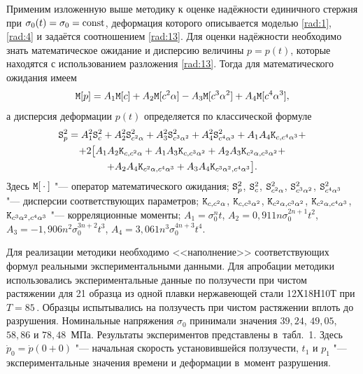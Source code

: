 Применим изложенную выше методику к оценке надёжности единичного стержня при $\sigma_0(t)=\sigma_0={\rm const}$, деформация которого описывается моделью \eqref{rad:1}, \eqref{rad:4} и задаётся соотношением \eqref{rad:13}. 
Для оценки надёжности необходимо знать математическое ожидание и дисперсию величины $p=p(t)$, которые находятся с использованием разложения \eqref{rad:13}. Тогда для математического ожидания имеем
$$
{\tt M}[p]=A_1 {\tt M}[c]+A_2 {\tt M}[c^2\alpha]- A_3 {\tt M}[c^3\alpha^2]+
A_4 {\tt M}[c^4\alpha^3],
$$
а дисперсия деформации $p(t)$ определяется по классической формуле
\begin{multline}
{\tt S}_p^2=A_1^2{\tt S}_c^2+A_2^2{\tt S}_{c^2\alpha}^2+A_3^2{\tt S}_{c^3\alpha^2}^2+A_4^2{\tt S}_{c^4\alpha^3}^2+ A_1A_4 {
\tt K}_{c,c^4\alpha^3}+ \\ 
+
2\bigl[A_1A_2{\tt K}_{c,c^2\alpha}+ A_1A_3{\tt K}_{c,c^3\alpha^2}+ A_2A_3 {\tt K}_{c^2\alpha,c^3\alpha^2}+ \\ 
+A_2A_4{\tt K}_{c^2\alpha,c^4\alpha^3}+A_3A_4{\tt K}_{c^3\alpha^2,c^4\alpha^3}\bigr].
\label{rad:18}
\end{multline}
Здесь   ${\tt M}[{}\cdot{}]$ "--- оператор математического ожидания;
${\tt S}_p^2$, ${\tt S}_c^2$, ${\tt S}_{c^2\alpha}^2$, ${\tt S}_{c^3\alpha^2}^2$, ${\tt S}_{c^4\alpha^3}^2$ "--- дисперсии соответствующих параметров;  
${\tt K}_{c,c^2\alpha}$, ${\tt K}_{c,c^3\alpha^2}$, ${\tt K}_{c^2\alpha,c^3\alpha^2}$, ${\tt K}_{c^2\alpha,c^4\alpha^3}$,\linebreak ${\tt K}_{c^3\alpha^2,c^4\alpha^3}$ "--- корреляционные моменты;
$A_1=\sigma_0^nt$, $A_2=0,911n\sigma_0^{2n+1}t^2$, $A_3={-1,906n^2\sigma_0^{3n+2}t^3}$, $A_4=3,061n^3\sigma_0^{4n+3}t^4$.

Для реализации методики необходимо <<наполнение>> соответствующих \linebreak формул реальными экспериментальными данными. 
Для апробации методики использовались экспериментальные данные \cite{rad:bib:24} по ползучести при чистом растяжении для 21 образца из одной плавки нержавеющей стали 12Х18Н10Т при $T=85$\,\textcelsius.
Образцы испытывались на ползучесть при чистом растяжении вплоть до разрушения. 
Номинальные напряжения  $\sigma_0$ принимали значения $39,24$, $49,05$, $58,86$ и $78,48$~МПа. 
Результаты экспериментов представлены в~табл.~1. Здесь $\dot{p}_0=\dot{p}(0+0)$ "--- начальная скорость установившейся ползучести, $t_1$ и $p_1$ "--- экспериментальные значения времени и деформации в~момент разрушения.

